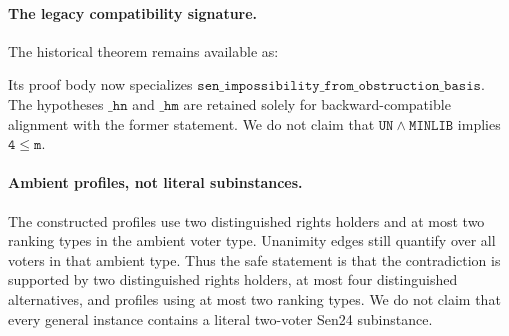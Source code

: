 \paragraph{The legacy compatibility signature.}
The historical theorem remains available as:
\begin{quote}
\end{quote}
Its proof body now specializes \(\mathtt{sen\_impossibility\_from\_obstruction\_basis}\).
The hypotheses \(\mathtt{\_hn}\) and \(\mathtt{\_hm}\) are retained solely for backward-compatible alignment with the former statement.
We do not claim that \(\mathtt{UN \wedge MINLIB}\) implies \(\mathtt{4 \leq m}\).

\paragraph{Ambient profiles, not literal subinstances.}
The constructed profiles use two distinguished rights holders and at most two ranking types in the ambient voter type.
Unanimity edges still quantify over all voters in that ambient type.
Thus the safe statement is that the contradiction is supported by two distinguished rights holders, at most four distinguished alternatives, and profiles using at most two ranking types.
We do not claim that every general instance contains a literal two-voter Sen24 subinstance.
